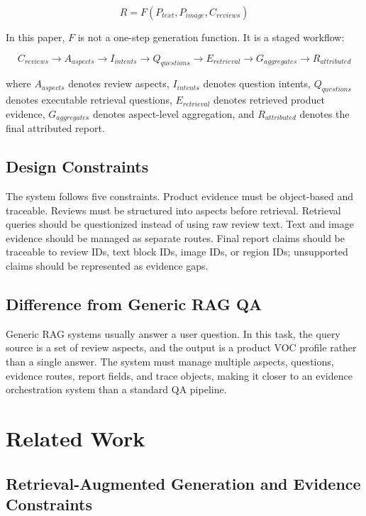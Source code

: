 \documentclass[11pt]{article}
\begin{document}
\[
R = F(P_{text}, P_{image}, C_{reviews})
\]

In this paper, \(F\) is not a one-step generation function. It is a staged workflow:

\[
C_{reviews} \rightarrow A_{aspects} \rightarrow I_{intents} \rightarrow Q_{questions} \rightarrow E_{retrieval} \rightarrow G_{aggregates} \rightarrow R_{attributed}
\]

where \(A_{aspects}\) denotes review aspects, \(I_{intents}\) denotes question intents, \(Q_{questions}\) denotes executable retrieval questions, \(E_{retrieval}\) denotes retrieved product evidence, \(G_{aggregates}\) denotes aspect-level aggregation, and \(R_{attributed}\) denotes the final attributed report.

\subsection{Design Constraints}

The system follows five constraints. Product evidence must be object-based and traceable. Reviews must be structured into aspects before retrieval. Retrieval queries should be questionized instead of using raw review text. Text and image evidence should be managed as separate routes. Final report claims should be traceable to review IDs, text block IDs, image IDs, or region IDs; unsupported claims should be represented as evidence gaps.

\subsection{Difference from Generic RAG QA}

Generic RAG systems usually answer a user question. In this task, the query source is a set of review aspects, and the output is a product VOC profile rather than a single answer. The system must manage multiple aspects, questions, evidence routes, report fields, and trace objects, making it closer to an evidence orchestration system than a standard QA pipeline.

\section{Related Work}
\subsection{Retrieval-Augmented Generation and Evidence Constraints}
\end{document}
